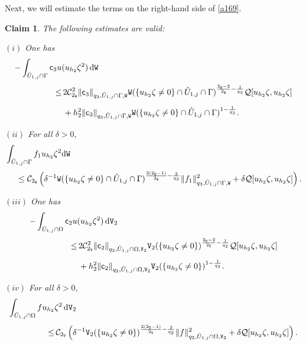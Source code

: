 \documentclass[reqno, 11pt, a4paper]{amsart}
\newtheorem{cl}{Claim}
\numberwithin{equation}{section}
\newcommand{\ops}{\mathcal{Q}}
\newcommand{\xv}{2_{\mathtt{V}}}
\newcommand{\xw}{2_{\mathtt{W}}}
\newcommand{\fc}{\mathsf c}
\newcommand{\wghtv}{\mathtt{V}}
\newcommand{\wghtw}{\mathtt{W}}
\newcommand{\dwv}{\textnormal{d} \mathtt{V}}
\newcommand{\dww}{\textnormal{d} \mathtt{W}}
\begin{document}
Next, we will estimate the terms on the right-hand side of \eqref{a169}.

\begin{cl}\label{accontb2}
The following estimates are valid:

\medskip

\noindent $(i)$ One has
\begin{align*}
-\int _{\hat U _{1,j} \cap \Gamma }  \fc _3  u & (u_{h_{2}}  \zeta ^2 ) \,  \dww    \\[3pt] 
 \leq & \displaystyle \,  2 \mathcal C ^2 _{\xw} \Vert \fc _3 \Vert _{q_3 ,\hat U _{1,j} \cap \Gamma , \wghtw}  \wghtw  ( \{u_{h_{2}}  \zeta \neq 0\} \cap \hat U _{1,j} \cap \Gamma ) ^ {\frac{\xw - 2}{\xw} - \frac{1}{q_3}}  \ops [ u_{h_{2}}  \zeta , u_{h_{2}}  \zeta ] \\[5pt]
& \displaystyle \, +  h_{2}^2 \Vert \fc _3 \Vert _{q_3 , \hat U _{1,j} \cap \Gamma , \wghtw } \wghtw  (\{ u_{h_{2}}  \zeta \neq 0\} \cap \hat U _{1,j} \cap \Gamma )^{1-\frac{1}{q_3}}. 
\end{align*}

\noindent  $(ii)$ For all  $\delta >0$,
\begin{align*}
&\int _{\hat U _{1,j} \cap \Gamma }  f_1 u_{h_{2}}  \zeta ^2  \dww\\[3pt]  
& \quad \ \leq \mathcal C_{\xw} \left( \delta ^{-1}  \wghtw  (\{ u_{h_{2}}  \zeta \neq 0\}\cap \hat U _{1,j} \cap \Gamma ) ^ {  \frac{2(\xw -1)}{\xw} - \frac{2}{q_3}} \Vert f_1 \Vert _{ q_3 , \hat U _{1,j} \cap \Gamma , \wghtw } ^2  + \delta \ops [ u_{h_{2}}  \zeta  , u_{h_{2}}  \zeta ] \right).
\end{align*} 

\medskip

\noindent  $(iii)$ One has
\begin{align*}
-\int _{\hat U _{1,j} \cap \Omega }  \fc _2 u & ( u_{h_{2}}  \zeta ^2 ) \, \dwv _{2} \\[3pt]
 \leq & \displaystyle \,  2 \mathcal C_{\xv} ^2\Vert \fc _2 \Vert _{q_2 , \hat U _{1,j} \cap \Omega  , \wghtv _2}  \wghtv _2( \{u_{h_{2}}  \zeta \neq 0\} ) ^ {\frac{\xv -2}{\xv} - \frac{1}{q_2}} \ops [ u_{h_{2}}  \zeta , u_{h_{2}}  \zeta] \\[5pt]
& \displaystyle \, +  h_{2}^2 \Vert \fc _2 \Vert _{q_2 ,  \hat U _{1,j} \cap \Omega   , \wghtv _2} \wghtv _2 ( \{u_{h_{2}}  \zeta \neq 0\} )^{1-\frac{1}{q_2}}.
\end{align*}

\noindent  $(iv)$ For all $\delta >0$,
\begin{align*}
\int _{\hat U _{1,j} \cap \Omega }  f u_{h_{2}}  & \zeta ^2 \, \dwv _{2} \\[3pt]
 \leq  & \displaystyle \, \mathcal C_{\xv} \left( \delta ^{-1} \wghtv _2 ( \{u_{h_{2}}  \zeta \neq 0\}) ^ {\frac{2(\xv -1)}{\xv} - \frac{2}{q _2}} \Vert f \Vert _{q_2 ,  \hat U _{1,j} \cap \Omega   , \wghtv _2 } ^2  + \delta  \ops [u_{h_{2}}  \zeta , u_{h_{2}}  \zeta ] \right).
\end{align*}

\end{cl}
\end{document}
